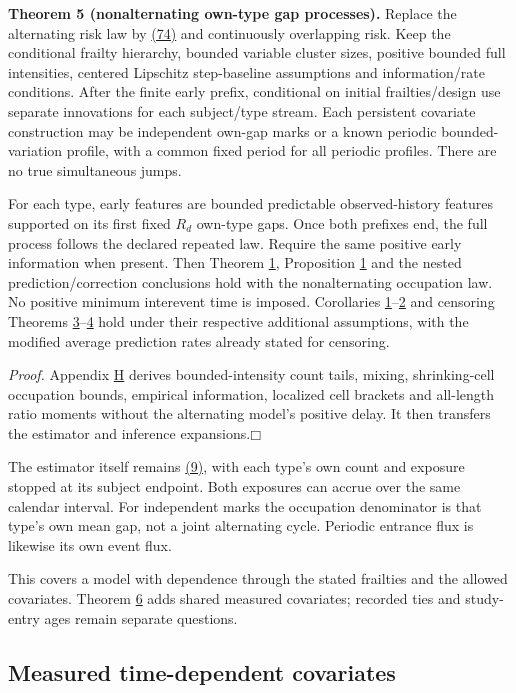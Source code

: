 \documentclass[11pt]{article}
\providecommand{\square}{\mdlgwhtsquare}
\begin{document}
\label{res:Theorem-5}
\textbf{Theorem 5 (nonalternating own-type gap processes).} Replace the alternating risk law by \hyperref[eq:74]{(74)} and continuously overlapping risk. Keep the conditional frailty hierarchy, bounded variable cluster sizes, positive bounded full intensities, centered Lipschitz step-baseline assumptions and information/rate conditions. After the finite early prefix, conditional on initial frailties/design use separate innovations for each subject/type stream. Each persistent covariate construction may be independent own-gap marks or a known periodic bounded-variation profile, with a common fixed period for all periodic profiles. There are no true simultaneous jumps.

For each type, early features are bounded predictable observed-history features supported on its first fixed \(R_d\) own-type gaps. Once both prefixes end, the full process follows the declared repeated law. Require the same positive early information when present. Then Theorem \hyperref[res:Theorem-1]{1}, Proposition \hyperref[res:Proposition-1]{1} and the nested prediction/correction conclusions hold with the nonalternating occupation law. No positive minimum interevent time is imposed. Corollaries \hyperref[res:Corollary-1]{1}--\hyperref[res:Corollary-2]{2} and censoring Theorems \hyperref[res:Theorem-3]{3}--\hyperref[res:Theorem-4]{4} hold under their respective additional assumptions, with the modified average prediction rates already stated for censoring.

\textit{Proof.} Appendix \hyperref[sec:H]{H} derives bounded-intensity count tails, mixing, shrinking-cell occupation bounds, empirical information, localized cell brackets and all-length ratio moments without the alternating model's positive delay. It then transfers the estimator and inference expansions.\hfill$\square$

The estimator itself remains \hyperref[eq:9]{(9)}, with each type's own count and exposure stopped at its subject endpoint. Both exposures can accrue over the same calendar interval. For independent marks the occupation denominator is that type's own mean gap, not a joint alternating cycle. Periodic entrance flux is likewise its own event flux.

This covers a model with dependence through the stated frailties and the allowed covariates. Theorem \hyperref[res:Theorem-6]{6} adds shared measured covariates; recorded ties and study-entry ages remain separate questions.

\subsection{Measured time-dependent covariates}\label{sec:5.6}
\end{document}
